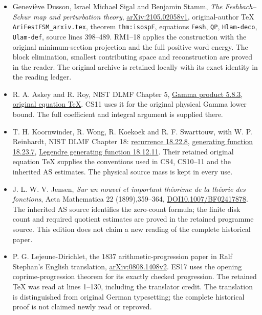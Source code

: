 \documentclass[11pt]{article}
\begin{document}
\begin{itemize}
\tightlist
\item
  Geneviève Dusson, Israel Michael Sigal and Benjamin Stamm, \emph{The Feshbach--Schur map and perturbation theory}, \href{https://arxiv.org/abs/2105.02058v1}{arXiv:2105.02058v1}, original-author TeX \texttt{AriFestFSM\_arxiv.tex}, theorem \texttt{thm:isospF}, equations \texttt{Fesh}, \texttt{QP}, \texttt{Hlam-deco}, \texttt{Ulam-def}, source lines 398--489. RM1--18 applies the construction with the original minimum-section projection and the full positive word energy. The block elimination, smallest contributing space and reconstruction are proved in the reader. The original archive is retained locally with its exact identity in the reading ledger.
\item
  R. A. Askey and R. Roy, NIST DLMF Chapter 5, \href{https://dlmf.nist.gov/5.8.E3}{Gamma product 5.8.3}, \href{https://dlmf.nist.gov/5.8.E3.tex}{original equation TeX}. CS11 uses it for the original physical Gamma lower bound. The full coefficient and integral argument is supplied there.
\item
  T. H. Koornwinder, R. Wong, R. Koekoek and R. F. Swarttouw, with W. P. Reinhardt, NIST DLMF Chapter 18: \href{https://dlmf.nist.gov/18.22.E8}{recurrence 18.22.8}, \href{https://dlmf.nist.gov/18.23.E7}{generating function 18.23.7}, \href{https://dlmf.nist.gov/18.12.E11}{Legendre generating function 18.12.11}. Their retained original equation TeX supplies the conventions used in CS4, CS10--11 and the inherited AS estimates. The physical source mass is kept in every use.
\item
  J. L. W. V. Jensen, \emph{Sur un nouvel et important théorème de la théorie des fonctions}, Acta Mathematica 22 (1899),359--364, \href{https://doi.org/10.1007/BF02417878}{DOI10.1007/BF02417878}. The inherited AS source identifies the zero-count formula; the finite disk count and required quotient estimates are proved in the retained programme source. This edition does not claim a new reading of the complete historical paper.
\item
  P. G. Lejeune-Dirichlet, the 1837 arithmetic-progression paper in Ralf Stephan's English translation, \href{https://arxiv.org/abs/0808.1408v2}{arXiv:0808.1408v2}. ES17 uses the opening coprime-progression theorem for its exactly checked progression. The retained TeX was read at lines 1--130, including the translator credit. The translation is distinguished from original German typesetting; the complete historical proof is not claimed newly read or reproved.
\end{itemize}
\end{document}
